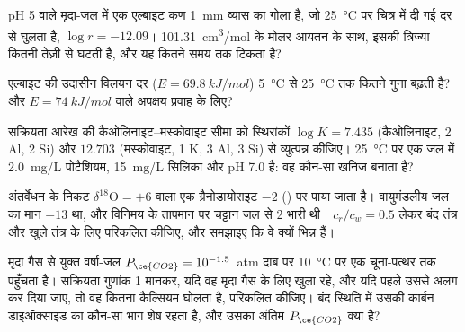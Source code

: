 \begin{exercise}[$\star\star$]\label{exo:b3:water-rock-interaction:7}
pH 5 वाले मृदा-जल में एक एल्बाइट कण \qty{1}{mm} व्यास का गोला है, जो
\qty{25}{\celsius} पर चित्र में दी गई दर से घुलता है, $\log r = -12.09$।
\qty{101.31}{cm^3/mol} के मोलर आयतन के साथ, इसकी त्रिज्या कितनी तेज़ी से
घटती है, और यह कितने समय तक टिकता है?
\end{exercise}

\begin{exercise}[$\star\star$]\label{exo:b3:water-rock-interaction:8}
एल्बाइट की उदासीन विलयन दर ($E =
\qty{69.8}{kJ/mol}$) \qty{5}{\celsius} से \qty{25}{\celsius} तक कितने गुना बढ़ती है? और
$E = \qty{74}{kJ/mol}$ वाले अपक्षय प्रवाह के लिए?
\end{exercise}

\begin{exercise}[$\star\star$]\label{exo:b3:water-rock-interaction:9}
सक्रियता आरेख की कैओलिनाइट--मस्कोवाइट सीमा को स्थिरांकों
$\log K = 7.435$ (कैओलिनाइट, 2 Al, 2 Si) और $12.703$ (मस्कोवाइट, 1 K, 3 Al, 3 Si) से व्युत्पन्न कीजिए।
\qty{25}{\celsius} पर एक जल में \qty{2.0}{mg/L} पोटैशियम,
\qty{15}{mg/L} सिलिका और pH 7.0 है: वह कौन-सा खनिज बनाता है?
\end{exercise}

\begin{exercise}[$\star\star\star$]\label{exo:b3:water-rock-interaction:10}
अंतर्वेधन के निकट $\delta^{18}\mathrm O = +6$ वाला एक ग्रैनोडायोराइट
$-2$ (\unit{\permil}) पर पाया जाता है। वायुमंडलीय जल का मान $-13$ था, और विनिमय के तापमान पर
चट्टान जल से \qty{2}{\permil} भारी थी।
$c_r/c_w = 0.5$ लेकर बंद तंत्र और
खुले तंत्र के लिए  परिकलित कीजिए, और समझाइए कि वे क्यों भिन्न हैं।
\end{exercise}

\begin{exercise}[$\star\star\star$]\label{exo:b3:water-rock-interaction:11}
मृदा गैस से युक्त वर्षा-जल $P_{\ce{CO2}} = 10^{-1.5}$~atm दाब पर
\qty{10}{\celsius} पर एक चूना-पत्थर तक पहुँचता है। सक्रियता गुणांक 1 मानकर,
यदि वह मृदा गैस के लिए खुला रहे, और यदि पहले उससे अलग कर दिया जाए, तो वह कितना कैल्सियम घोलता है, परिकलित कीजिए।
बंद स्थिति में उसकी कार्बन डाइऑक्साइड का कौन-सा भाग शेष रहता है,
और उसका अंतिम $P_{\ce{CO2}}$ क्या है?
\end{exercise}

